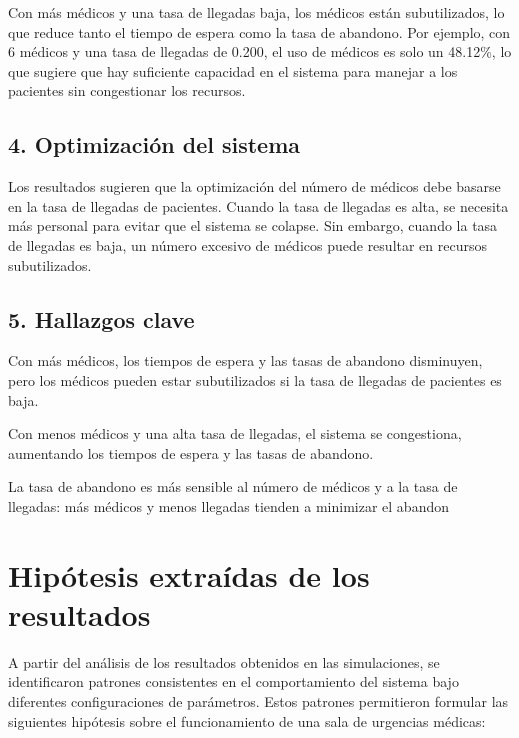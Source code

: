\documentclass[12pt]{article}
\begin{document}
Con más médicos y una tasa de llegadas baja, los médicos están subutilizados, lo que reduce tanto el tiempo de espera como la tasa de abandono. Por ejemplo, con 6 médicos y una tasa de llegadas de 0.200, el uso de médicos es solo un 48.12\%, lo que sugiere que hay suficiente capacidad en el sistema para manejar a los pacientes sin congestionar los recursos.

\subsection{4. Optimización del sistema}
Los resultados sugieren que la optimización del número de médicos debe basarse en la tasa de llegadas de pacientes. Cuando la tasa de llegadas es alta, se necesita más personal para evitar que el sistema se colapse. Sin embargo, cuando la tasa de llegadas es baja, un número excesivo de médicos puede resultar en recursos subutilizados.

\subsection{5. Hallazgos clave}
Con más médicos, los tiempos de espera y las tasas de abandono disminuyen, pero los médicos pueden estar subutilizados si la tasa de llegadas de pacientes es baja.

Con menos médicos y una alta tasa de llegadas, el sistema se congestiona, aumentando los tiempos de espera y las tasas de abandono.

La tasa de abandono es más sensible al número de médicos y a la tasa de llegadas: más médicos y menos llegadas tienden a minimizar el abandon

\section{Hipótesis extraídas de los resultados}

A partir del análisis de los resultados obtenidos en las simulaciones, se identificaron patrones consistentes en el comportamiento del sistema bajo diferentes configuraciones de parámetros. Estos patrones permitieron formular las siguientes hipótesis sobre el funcionamiento de una sala de urgencias médicas:
\end{document}
